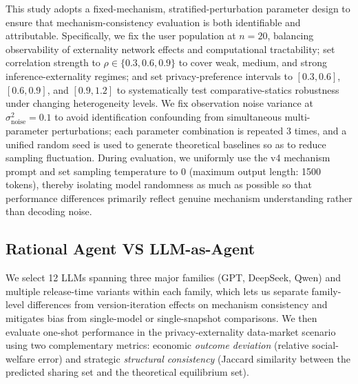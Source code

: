 \documentclass[sigconf,anonymous,review]{acmart}
\theoremstyle{definition}
\begin{document}
This study adopts a fixed-mechanism, stratified-perturbation parameter design to ensure that mechanism-consistency evaluation is both identifiable and attributable. Specifically, we fix the user population at \(n=20\), balancing observability of externality network effects and computational tractability; set correlation strength to \(\rho\in\{0.3,0.6,0.9\}\) to cover weak, medium, and strong inference-externality regimes; and set privacy-preference intervals to \([0.3,0.6]\), \([0.6,0.9]\), and \([0.9,1.2]\) to systematically test comparative-statics robustness under changing heterogeneity levels. We fix observation noise variance at \(\sigma^2_{\text{noise}}=0.1\) to avoid identification confounding from simultaneous multi-parameter perturbations; each parameter combination is repeated \(3\) times, and a unified random seed is used to generate theoretical baselines so as to reduce sampling fluctuation. During evaluation, we uniformly use the v4 mechanism prompt and set sampling temperature to \(0\) (maximum output length: 1500 tokens), thereby isolating model randomness as much as possible so that performance differences primarily reflect genuine mechanism understanding rather than decoding noise.

\subsection{Rational Agent VS LLM-as-Agent}
\label{subsec:static_results}
We select 12 LLMs spanning three major families (GPT, DeepSeek, Qwen) and multiple release-time variants within each family, which lets us separate family-level differences from version-iteration effects on mechanism consistency and mitigates bias from single-model or single-snapshot comparisons. We then evaluate one-shot performance in the privacy-externality data-market scenario using two complementary metrics: economic \emph{outcome deviation} (relative social-welfare error) and strategic \emph{structural consistency} (Jaccard similarity between the predicted sharing set and the theoretical equilibrium set).


%
\end{document}
